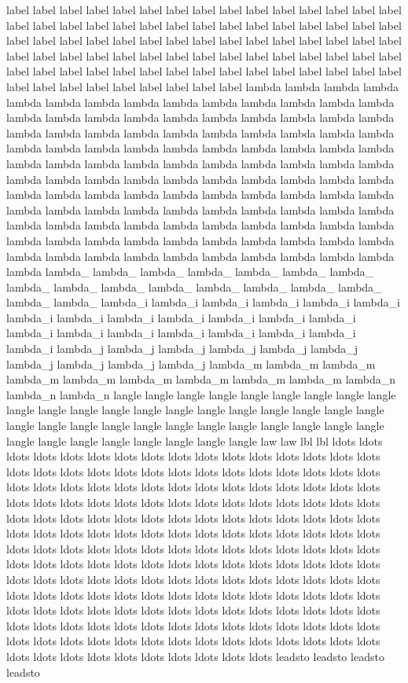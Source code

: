label label label label label label label label label label label label label label label label label label label label label label label label label label label label label label label label label label label label label label label label label label label label label label label label label label label label label label label label label label label label label label label label label label label label label label label label label label label label label label label label label label label label lambda lambda lambda lambda lambda lambda lambda lambda lambda lambda lambda lambda lambda lambda lambda lambda lambda lambda lambda lambda lambda lambda lambda lambda lambda lambda lambda lambda lambda lambda lambda lambda lambda lambda lambda lambda lambda lambda lambda lambda lambda lambda lambda lambda lambda lambda lambda lambda lambda lambda lambda lambda lambda lambda lambda lambda lambda lambda lambda lambda lambda lambda lambda lambda lambda lambda lambda lambda lambda lambda lambda lambda lambda lambda lambda lambda lambda lambda lambda lambda lambda lambda lambda lambda lambda lambda lambda lambda lambda lambda lambda lambda lambda lambda lambda lambda lambda lambda lambda lambda lambda lambda lambda lambda lambda lambda lambda lambda lambda lambda lambda lambda lambda lambda lambda lambda_ lambda_ lambda_ lambda_ lambda_ lambda_ lambda_ lambda_ lambda_ lambda_ lambda_ lambda_ lambda_ lambda_ lambda_ lambda_ lambda_ lambda_i lambda_i lambda_i lambda_i lambda_i lambda_i lambda_i lambda_i lambda_i lambda_i lambda_i lambda_i lambda_i lambda_i lambda_i lambda_i lambda_i lambda_i lambda_i lambda_i lambda_i lambda_j lambda_j lambda_j lambda_j lambda_j lambda_j lambda_j lambda_j lambda_j lambda_j lambda_m lambda_m lambda_m lambda_m lambda_m lambda_m lambda_m lambda_m lambda_m lambda_n lambda_n lambda_n langle langle langle langle langle langle langle langle langle langle langle langle langle langle langle langle langle langle langle langle langle langle langle langle langle langle langle langle langle langle langle langle langle langle langle langle langle langle langle langle langle law law lbl lbl ldots ldots ldots ldots ldots ldots ldots ldots ldots ldots ldots ldots ldots ldots ldots ldots ldots ldots ldots ldots ldots ldots ldots ldots ldots ldots ldots ldots ldots ldots ldots ldots ldots ldots ldots ldots ldots ldots ldots ldots ldots ldots ldots ldots ldots ldots ldots ldots ldots ldots ldots ldots ldots ldots ldots ldots ldots ldots ldots ldots ldots ldots ldots ldots ldots ldots ldots ldots ldots ldots ldots ldots ldots ldots ldots ldots ldots ldots ldots ldots ldots ldots ldots ldots ldots ldots ldots ldots ldots ldots ldots ldots ldots ldots ldots ldots ldots ldots ldots ldots ldots ldots ldots ldots ldots ldots ldots ldots ldots ldots ldots ldots ldots ldots ldots ldots ldots ldots ldots ldots ldots ldots ldots ldots ldots ldots ldots ldots ldots ldots ldots ldots ldots ldots ldots ldots ldots ldots ldots ldots ldots ldots ldots ldots ldots ldots ldots ldots ldots ldots ldots ldots ldots ldots ldots ldots ldots ldots ldots ldots ldots ldots ldots ldots ldots ldots ldots ldots ldots ldots ldots ldots ldots ldots ldots ldots ldots ldots ldots ldots ldots ldots ldots ldots ldots ldots ldots ldots ldots ldots ldots ldots ldots ldots leadsto leadsto leadsto leadsto 
